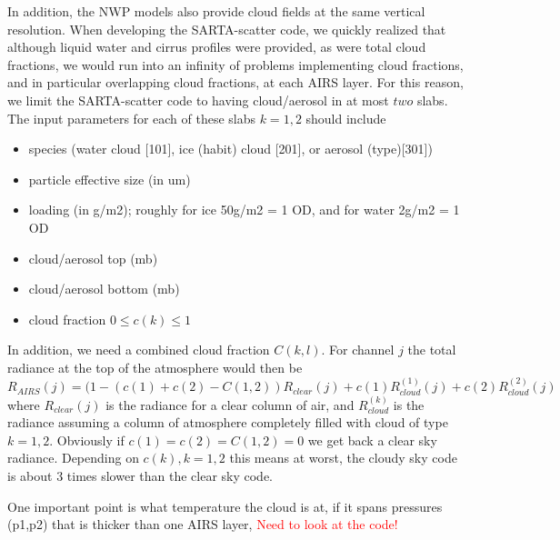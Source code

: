 \documentclass[11pt]{article}
\newcommand{\sasc}{\textsf{SARTA-scatter}\xspace}
\begin{document}
In addition, the NWP models also provide cloud fields at the same vertical resolution. When developing the \sasc code, we
quickly realized that although liquid water and cirrus profiles were provided, as were total cloud fractions, we would 
run into an infinity of problems implementing cloud fractions, and in particular overlapping cloud fractions, at each 
AIRS layer. For this reason, we limit the \sasc code to having cloud/aerosol in at most $two$ slabs. The input parameters
for each of these slabs $k=1,2$ 
 should include
\begin{itemize}
\item species (water cloud [101], ice (habit) cloud [201], or aerosol (type)[301])
\item particle effective size (in um)
\item loading (in g/m2); roughly for ice 50g/m2 = 1 OD, and for water 2g/m2 = 1 OD
\item cloud/aerosol top (mb)
\item cloud/aerosol bottom (mb)
\item cloud fraction $0 \le c(k) \le 1$
\end{itemize}

In addition, we need a combined cloud fraction $C(k,l)$. For channel $j$ the total radiance at the top of the atmosphere 
would then be
\[
R_{AIRS}(j) = (1 -  (c(1) + c(2) - C(1,2)) R_{clear}(j) + c(1) R^{(1)}_{cloud}(j) + c(2) R^{(2)}_{cloud}(j)
\]
where $R_{clear}(j)$ is the radiance for a clear column of air, and $R^{(k)}_{cloud}$ is the radiance assuming 
a column of atmosphere completely filled with cloud of type $k=1,2$. Obviously if $c(1) = c(2) = C(1,2) = 0$ we get 
back a clear sky radiance. Depending on $c(k),k=1,2$ this means at worst, the cloudy sky code is about 3 times 
slower than the clear sky code.

One important point is what temperature the cloud is at, if it spans pressures (p1,p2) that is thicker than one AIRS layer, 
\textcolor{red}{Need to look at the code!}
\end{document}

